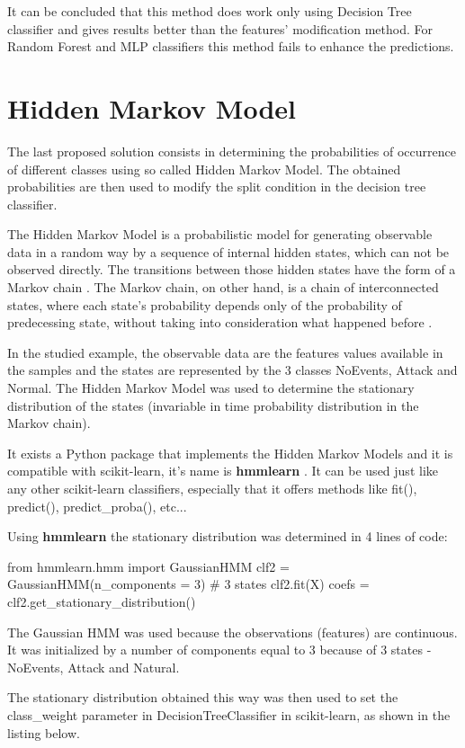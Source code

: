 It can be concluded that this method does work only using Decision Tree classifier and gives results better than the features' modification method. For Random Forest and MLP classifiers this method fails to enhance the predictions.

\section{Hidden Markov Model}
The last proposed solution consists in determining the probabilities of occurrence of different classes using so called Hidden Markov Model. The obtained probabilities are then used to modify the split condition in the decision tree classifier. 

The Hidden Markov Model is a probabilistic model for generating observable data in a random way by a sequence of internal hidden states, which can not be observed directly. The transitions between those hidden states have the form of a Markov chain \cite{noauthor_tutorial_nodate}. The Markov chain, on other hand, is a chain of interconnected states, where each state's probability depends only of the probability of predecessing state, without taking into consideration what happened before \cite{amit_introduction_2019}.

In the studied example, the observable data are the features values available in the samples and the states are represented by the 3 classes NoEvents, Attack and Normal. The Hidden Markov Model was used to determine the stationary distribution of the states (invariable in time probability distribution in the Markov chain).

It exists a Python package that implements the Hidden Markov Models and it is compatible with scikit-learn, it's name is \textbf{hmmlearn} \cite{noauthor_hmmlearn_2020}. It can be used just like any other scikit-learn classifiers, especially that it offers methods like fit(), predict(), predict\_proba(), etc...

Using \textbf{hmmlearn} the stationary distribution was determined in 4 lines of code:
\begin{python}
from hmmlearn.hmm import GaussianHMM 
clf2 = GaussianHMM(n_components = 3) # 3 states
clf2.fit(X)
coefs = clf2.get_stationary_distribution()
\end{python}
The Gaussian HMM was used because the observations (features) are continuous. It was initialized by a number of components equal to 3 because of 3 states - NoEvents, Attack and Natural.

The stationary distribution obtained this way was then used to set the class\_weight parameter in DecisionTreeClassifier in scikit-learn, as shown in the listing below.

